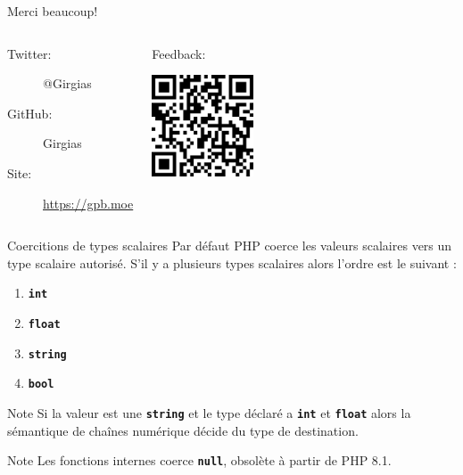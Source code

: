 \documentclass[10pt]{beamer}
\newcommand{\type}[1]{\texttt{\textbf{#1}}}
\begin{document}
{
\begin{frame}[standout]
    Merci beaucoup!
    \vfill
    \begin{columns}[T,onlytextwidth]
            \begin{center}
                \begin{description}
                    \item[Twitter:] @Girgias
                    \item[GitHub:] Girgias
                    \item[Site:] \url{https://gpb.moe}
                \end{description}
            \end{center}
            \begin{center}
                Feedback:
                
                \vspace{0.5cm}
                \includegraphics[width=3cm]{images/Forum_PHP_2022_QRCode.png}
            \end{center}
    \end{columns}
\end{frame}
}

\appendix


\begin{frame}[fragile]{Coercitions de types scalaires}
    Par défaut PHP coerce les valeurs scalaires vers un type scalaire autorisé.
    S'il y a plusieurs types scalaires alors l'ordre est le suivant :
    \begin{enumerate}
        \item \type{int}
        \item \type{float}
        \item \type{string}
        \item \type{bool}
    \end{enumerate}
    \begin{exampleblock}{Note}
       Si la valeur est une \type{string} et le type déclaré a \type{int} et \type{float} alors la sémantique de chaînes numérique décide du type de destination.
    \end{exampleblock}
    \begin{exampleblock}{Note}
        Les fonctions internes coerce \type{null}, obsolète à partir de PHP 8.1.
    \end{exampleblock}
\end{frame}
\end{document}
